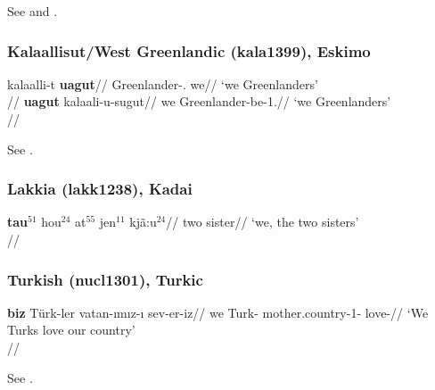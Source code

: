 See \citet[284; 292]{sohn1994} and \citet[151--154]{choi2014phd}.


\subsubsection{Kalaallisut/West Greenlandic (kala1399), Eskimo}


\pex
\a
\begingl
\gla kalaalli-t \textbf{uagut}//
\glb Greenlander-\Abs{}.\Pl{} we//
\glft `we Greenlanders'\\{\citep[after][110; gloss extrapolated]{fortescue1984}}//
\endgl
\a
\begingl
\gla \textbf{uagut} kalaali-u-sugut//
\glb we Greenlander-be-1\Pl{}.\Ptcp{}//
\glft `we Greenlanders' \\{\citep[after][257]{fortescue1984}}//
\endgl
\xe

See \citet[110, 253, 256f.]{fortescue1984}.

\subsubsection{Lakkia (lakk1238), Kadai}

\ex 
\begingl
\gla \textbf{tau$^{51}$} hou$^{24}$ {\textglotstop{}at$^{55}$ jen$^{11}$ kjã:u$^{24}$}//
\Pl{} two sister//
\glft `we, the two sisters'\\\citep[137, (40)]{fan2019}//
\endgl
\xe

\subsubsection{Turkish (nucl1301), Turkic}

\ex 
\begingl
\gla \textbf{biz} Türk-ler vatan-{\i}m{\i}z-{\i} sev-er-iz//
\glb we Turk-\Pl{} mother.country-1\Pl-\Acc{} love-\Pl{}//
\glft `We Turks love our country'\\\citep[297, (1075)]{kornfilt1997}//
\endgl
\xe

See \citet[288, 297f.]{kornfilt1997}.



